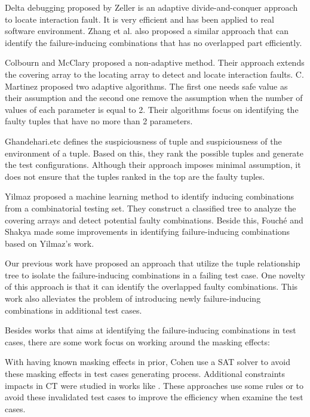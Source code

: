 \documentclass{sig-alternate}
\begin{document}
Delta debugging \cite{zeller2002simplifying} proposed by Zeller is an adaptive divide-and-conquer approach to locate interaction fault. It is very efficient and has been applied to real software environment. Zhang et al. \cite{zhang2011characterizing} also proposed a similar approach that can identify the failure-inducing combinations that has no overlapped part efficiently.

Colbourn and McClary \cite{colbourn2008locating} proposed a non-adaptive method. Their approach extends the covering array to the locating array to detect and locate interaction faults. C. Martinez \cite{martinez2008algorithms,martinez2009locating} proposed two adaptive algorithms. The first one needs safe value as their assumption and the second one remove the assumption when the number of values of each parameter is equal to 2. Their algorithms focus on identifying the faulty tuples that have no more than 2 parameters.

Ghandehari.etc \cite{ghandehari2012identifying} defines the suspiciousness of tuple and suspiciousness of the environment of a tuple. Based on this, they rank the possible tuples and generate the test configurations. Although their approach imposes minimal assumption, it does not ensure that the tuples ranked in the top are the faulty tuples.

Yilmaz \cite{yilmaz2006covering} proposed a machine learning method to identify inducing combinations from a combinatorial testing set. They construct a classified tree to analyze the covering arrays and detect potential faulty combinations. Beside this, Fouché \cite{fouche2009incremental} and Shakya \cite{shakya2012isolating} made some improvements in identifying failure-inducing combinations based on Yilmaz's work.

Our previous work \cite{niu2013identifying} have proposed an approach that utilize the tuple relationship tree to isolate the failure-inducing combinations in a failing test case. One novelty of this approach is that it can identify the overlapped faulty combinations. This work also alleviates the problem of introducing newly failure-inducing combinations in additional test cases.

Besides works that aims at identifying the failure-inducing combinations in test cases, there are some work focus on working around the masking effects:

With having known masking effects in prior, Cohen \cite{cohen2008constructing} use a SAT solver to avoid these masking effects in test cases generating process. Additional constraints impacts in CT were studied in works like \cite{bryce2006prioritized,chen2010combinatorial,calvagna2008logic,grindal2006handling,yilmaz2013test}. These approaches use some rules or to avoid these invalidated test cases to improve the efficiency when examine the test cases.
\end{document}
